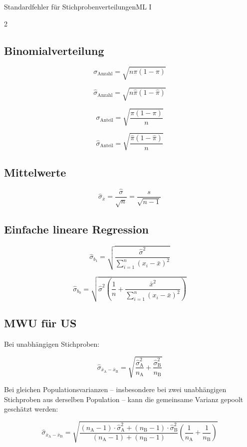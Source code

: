 \begin{formulaBox}{Standardfehler für Stichprobenverteilungen}{ML I}
\label{box:standardfehler}
\begin{multicols}{2}
\subsection*{Binomialverteilung}

$$\sigma_{\mathrm{Anzahl}}=\sqrt{n \pi (1-\pi)}$$

$$\hat{\sigma}_{\mathrm{Anzahl}}=\sqrt{n \hat{\pi} (1-\hat{\pi})}$$

$$\sigma_{\mathrm{Anteil}}=\sqrt{\frac{\pi (1-\pi)}{n}}$$

$$\hat{\sigma}_{\mathrm{Anteil}}=\sqrt{\frac{\hat{\pi} (1-\hat{\pi})}{n}}$$

\subsection*{Mittelwerte}

$$\hat{\sigma}_{\bar{x}}=\frac{\hat{\sigma}}{\sqrt{n}}=\frac{s}{\sqrt{n-1}}$$

\subsection*{Einfache lineare Regression}

\[
\hat{\sigma}_{b_1}
=
\sqrt{
\frac{\hat{\sigma}^2}
{\sum_{i=1}^n (x_i - \bar x)^2}
}
\]

\[
  \hat{\sigma}_{b_0}
=
\sqrt{
\hat{\sigma}^2
\left(
\frac{1}{n}
+
\frac{\bar x^2}
{\sum_{i=1}^n (x_i - \bar x)^2}
\right)
}
\]

\columnbreak

\subsection*{MWU für US}

Bei unabhängigen Stichproben:

\[
\hat{\sigma}_{\bar{x}_\mathrm{A}-\bar{x}_\mathrm{B}}
=\sqrt{\frac{\hat{\sigma}_\mathrm{A}^2}{n_\mathrm{A}}
+\frac{\hat{\sigma}_\mathrm{B}^2}{n_\mathrm{B}}}
\]

Bei gleichen Populationsvarianzen -- insbesondere bei zwei unabhängigen Stichproben aus derselben Population -- kann die gemeinsame Varianz gepoolt geschätzt werden:

$$\hat{\sigma}_{\bar{x}_\mathrm{A}-\bar{x}_\mathrm{B}}=\sqrt{\frac{(n_\mathrm{A}-1)\cdot\hat{\sigma}^2_\mathrm{A}+(n_\mathrm{B}-1)\cdot\hat{\sigma}^2_\mathrm{B}}{(n_\mathrm{A}-1)+(n_\mathrm{B}-1)}(\frac{1}{n_\mathrm{A}}+\frac{1}{n_\mathrm{B}})}$$


\end{multicols}
\end{formulaBox}
